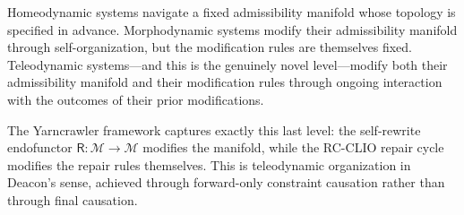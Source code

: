 Homeodynamic systems navigate a fixed admissibility manifold whose topology
is specified in advance. Morphodynamic systems modify their admissibility manifold
through self-organization, but the modification rules are themselves fixed.
Teleodynamic systems---and this is the genuinely novel level---modify both their
admissibility manifold and their modification rules through ongoing interaction
with the outcomes of their prior modifications.

The Yarncrawler framework captures exactly this last level: the self-rewrite
endofunctor $\mathsf{R}: \mathcal{M} \to \mathcal{M}$ modifies the manifold,
while the RC-CLIO repair cycle modifies the repair rules themselves. This is
teleodynamic organization in Deacon's sense, achieved through forward-only
constraint causation rather than through final causation.
